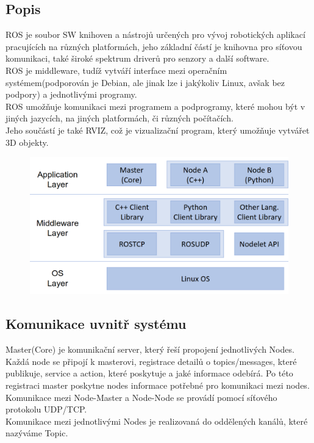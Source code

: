 \subsection{Popis}
ROS je soubor SW knihoven a nástrojů určených pro vývoj robotických aplikací pracujících na různých platformách, jeho základní částí je knihovna pro síťovou komunikaci, také široké spektrum driverů pro senzory a další software. \\
ROS je middleware, tudíž vytváří interface mezi operačním systémem(podporován je Debian, ale jinak lze i jakýkoliv Linux, avšak bez podpory) a jednotlivými programy.\\
ROS umožňuje komunikaci mezi programem a podprogramy, které mohou být v jiných jazycích, na jiných platformách, či různých počítačích.\\
Jeho součástí je také RVIZ, což je vizualizační program, který umožňuje vytvářet 3D objekty.\\
\begin{figure}[h!]
    \centering
    \includegraphics[scale = 0.2]{img/ROSCommMid.png}
\end{figure}
\subsection{Komunikace uvnitř systému}
Master(Core) je komunikační server, který řeší propojení jednotlivých Nodes. \\
Každá node se připojí k masterovi, registrace detailů o topics/messages, které publikuje, service a action, které poskytuje a jaké informace odebírá. Po této registraci master poskytne nodes informace potřebné pro komunikaci mezi nodes.\\
Komunikace mezi Node-Master a Node-Node se provádí pomocí síťového protokolu UDP/TCP.\\
Komunikace mezi jednotlivými Nodes je realizovaná do oddělených kanálů, které nazýváme Topic.
